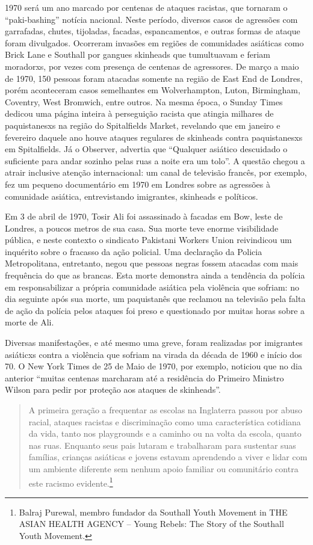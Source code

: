 1970 será um ano marcado por centenas de ataques racistas, que tornaram o “paki-bashing” notícia nacional. Neste período, diversos casos de agressões com garrafadas, chutes, tijoladas, facadas, espancamentos, e outras formas de ataque foram divulgados. Ocorreram invasões em regiões de comunidades asiáticas como Brick Lane e Southall por gangues skinheads que tumultuavam e feriam moradorxs, por vezes com presença de centenas de agressores. De março a maio de 1970, 150 pessoas foram atacadas somente na região de East End de Londres, porém aconteceram casos semelhantes em Wolverhampton, Luton, Birmingham, Coventry, West Bromwich, entre outros. Na mesma época, o Sunday Times dedicou uma página inteira à perseguição racista que atingia milhares de paquistanesxs na região do Spitalfields Market, revelando que em janeiro e fevereiro daquele ano houve ataques regulares de skinheads contra paquistanesxs em Spitalfields. Já o Observer, advertia que “Qualquer asiático descuidado o suficiente para andar sozinho pelas ruas a noite era um tolo”. A questão chegou a atrair inclusive atenção internacional: um canal de televisão francês, por exemplo, fez um pequeno documentário em 1970 em Londres sobre as agressões à comunidade asiática, entrevistando imigrantes, skinheads e políticos.

Em 3 de abril de 1970, Tosir Ali foi assassinado à facadas em Bow, leste de Londres, a poucos metros de sua casa. Sua morte teve enorme visibilidade pública, e neste contexto o sindicato Pakistani Workers Union reivindicou um inquérito sobre o fracasso da ação policial. Uma declaração da Policia Metropolitana, entretanto, negou que pessoas negras fossem atacadas com mais frequência do que as brancas. Esta morte demonstra ainda a tendência da polícia em responsabilizar a própria comunidade asiática pela violência que sofriam: no dia seguinte após sua morte, um paquistanês que reclamou na televisão pela falta de ação da polícia pelos ataques foi preso e questionado por muitas horas sobre a morte de Ali.

Diversas manifestações, e até mesmo uma greve, foram realizadas por imigrantes asiáticxs contra a violência que sofriam na virada da década de 1960 e início dos 70. O New York Times de 25 de Maio de 1970, por exemplo, noticiou que no dia anterior “muitas centenas marcharam até a residência do Primeiro Ministro Wilson para pedir por proteção aos ataques de skinheads”.

\begin{quote}
A primeira geração a frequentar as escolas na Inglaterra passou por abuso racial, ataques racistas e discriminação como uma característica cotidiana da vida, tanto nos playgrounds e a caminho ou na volta da escola, quanto nas ruas. Enquanto seus pais lutaram e trabalharam para sustentar suas famílias, crianças asiáticas e jovens estavam aprendendo a viver e lidar com um ambiente diferente sem nenhum apoio familiar ou comunitário contra este racismo evidente.\footnote{Balraj Purewal, membro fundador da Southall Youth Movement in THE ASIAN HEALTH AGENCY – Young Rebels: The Story of the Southall Youth Movement.}
\end{quote}

